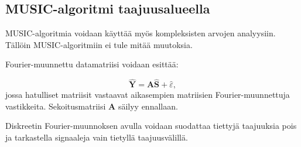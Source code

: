\subsection{MUSIC-algoritmi taajuusalueella}
MUSIC-algoritmia voidaan käyttää myös kompleksisten arvojen analyysiin. Tällöin MUSIC-algoritmiin ei tule mitää muutoksia.

Fourier-muunnettu datamatriisi voidaan esittää:

\begin{equation}
    \hat{\mathbf{Y}} = \mathbf{A}\hat{\mathbf{S}} + \hat{\varepsilon},
\end{equation}
jossa hatulliset matriisit vastaavat aikasempien matriisien Fourier-muunnettuja vastikkeita. Sekoitusmatriisi $\mathbf{A}$ säilyy ennallaan.

Diskreetin Fourier-muunnoksen avulla voidaan suodattaa tiettyjä taajuuksia pois ja tarkastella signaaleja vain tietyllä taajuusvälillä. 